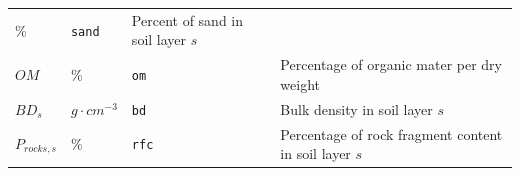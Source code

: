 \documentclass[]{book}
\begin{document}
\begin{longtable}[]{@{}llll@{}}
\begin{minipage}[t]{0.10\columnwidth}
\%\strut
\end{minipage} & \begin{minipage}[t]{0.12\columnwidth}\raggedright\strut
\texttt{sand}\strut
\end{minipage} & \begin{minipage}[t]{0.45\columnwidth}\raggedright\strut
Percent of sand in soil layer \(s\)\strut
\end{minipage}\tabularnewline
\begin{minipage}[t]{0.11\columnwidth}\raggedright\strut
\(OM\)\strut
\end{minipage} & \begin{minipage}[t]{0.10\columnwidth}\raggedright\strut
\%\strut
\end{minipage} & \begin{minipage}[t]{0.12\columnwidth}\raggedright\strut
\texttt{om}\strut
\end{minipage} & \begin{minipage}[t]{0.45\columnwidth}\raggedright\strut
Percentage of organic mater per dry weight\strut
\end{minipage}\tabularnewline
\begin{minipage}[t]{0.11\columnwidth}\raggedright\strut
\(BD_{s}\)\strut
\end{minipage} & \begin{minipage}[t]{0.10\columnwidth}\raggedright\strut
\(g\cdot cm^{-3}\)\strut
\end{minipage} & \begin{minipage}[t]{0.12\columnwidth}\raggedright\strut
\texttt{bd}\strut
\end{minipage} & \begin{minipage}[t]{0.45\columnwidth}\raggedright\strut
Bulk density in soil layer \(s\)\strut
\end{minipage}\tabularnewline
\begin{minipage}[t]{0.11\columnwidth}\raggedright\strut
\(P_{rocks,s}\)\strut
\end{minipage} & \begin{minipage}[t]{0.10\columnwidth}\raggedright\strut
\%\strut
\end{minipage} & \begin{minipage}[t]{0.12\columnwidth}\raggedright\strut
\texttt{rfc}\strut
\end{minipage} & \begin{minipage}[t]{0.45\columnwidth}\raggedright\strut
Percentage of rock fragment content in soil layer \(s\)\strut
\end{minipage}\tabularnewline

\end{longtable}
\end{document}
